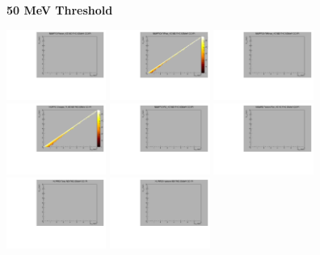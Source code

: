 \textbf{50 MeV Threshold}

\begin{center}

  \includegraphics[width=0.245\textwidth]{plots/response_matrix/Proton_KE_FHC_CC1Pi_50MeV.pdf}
  \includegraphics[width=0.245\textwidth]{plots/response_matrix/PiPlus_KE_FHC_CC1Pi_50MeV.pdf}
  \includegraphics[width=0.245\textwidth]{plots/response_matrix/PiMinus_KE_FHC_CC1Pi_50MeV.pdf}
  \includegraphics[width=0.245\textwidth]{plots/response_matrix/Charged_Pi_KE_FHC_CC1Pi_50MeV.pdf}
  \includegraphics[width=0.245\textwidth]{plots/response_matrix/Pi0_KE_FHC_CC1Pi_50MeV.pdf}
  \includegraphics[width=0.245\textwidth]{plots/response_matrix/Proton+Pion_KE_FHC_CC1Pi_50MeV.pdf}
  \includegraphics[width=0.245\textwidth]{plots/response_matrix/Total_FHC_CC1Pi_50MeV.pdf}
  \includegraphics[width=0.245\textwidth]{plots/response_matrix/Hadrons_FHC_CC1Pi_50MeV.pdf}

\end{center}


